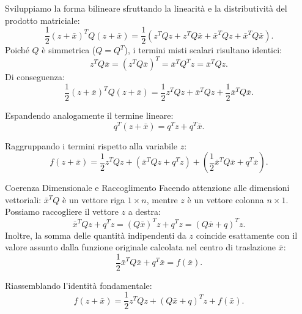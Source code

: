 Sviluppiamo la forma bilineare sfruttando la linearit\`a e la distributivit\`a del prodotto matriciale:
\begin{equation}
    \frac{1}{2} (z + \bar{x})^T Q (z + \bar{x}) = \frac{1}{2} \left( z^T Q z + z^T Q \bar{x} + \bar{x}^T Q z + \bar{x}^T Q \bar{x} \right).
\end{equation}
Poich\'e $Q$ \`e simmetrica ($Q = Q^T$), i termini misti scalari risultano identici:
\begin{equation}
    z^T Q \bar{x} = (z^T Q \bar{x})^T = \bar{x}^T Q^T z = \bar{x}^T Q z.
\end{equation}
Di conseguenza:
\begin{equation}
    \frac{1}{2} (z + \bar{x})^T Q (z + \bar{x}) = \frac{1}{2} z^T Q z + \bar{x}^T Q z + \frac{1}{2} \bar{x}^T Q \bar{x}.
\end{equation}

Espandendo analogamente il termine lineare:
\begin{equation}
    q^T (z + \bar{x}) = q^T z + q^T \bar{x}.
\end{equation}

Raggruppando i termini rispetto alla variabile $z$:
\begin{equation}
    f(z + \bar{x}) = \frac{1}{2} z^T Q z + \left( \bar{x}^T Q z + q^T z \right) + \left( \frac{1}{2} \bar{x}^T Q \bar{x} + q^T \bar{x} \right).
\end{equation}

\begin{noteblock}{Coerenza Dimensionale e Raccoglimento}
Facendo attenzione alle dimensioni vettoriali: $\bar{x}^T Q$ \`e un vettore riga $1 \times n$, mentre $z$ \`e un vettore colonna $n \times 1$. Possiamo raccogliere il vettore $z$ a destra:
\begin{equation}
    \bar{x}^T Q z + q^T z = (Q \bar{x})^T z + q^T z = (Q \bar{x} + q)^T z.
\end{equation}
Inoltre, la somma delle quantit\`a indipendenti da $z$ coincide esattamente con il valore assunto dalla funzione originale calcolata nel centro di traslazione $\bar{x}$:
\begin{equation}
    \frac{1}{2} \bar{x}^T Q \bar{x} + q^T \bar{x} = f(\bar{x}).
\end{equation}
\end{noteblock}

Riassemblando l'identit\`a fondamentale:
\begin{equation}
    f(z + \bar{x}) = \frac{1}{2} z^T Q z + (Q \bar{x} + q)^T z + f(\bar{x}).
    \label{eq:identita-traslazione-fondamentale}
\end{equation}

